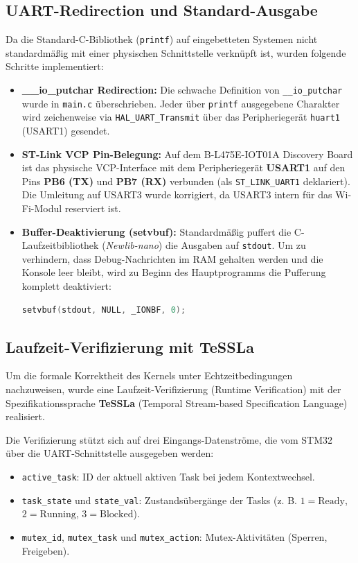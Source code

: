 \documentclass[11pt,a4paper]{article}
\begin{document}
\subsection{UART-Redirection und Standard-Ausgabe}
Da die Standard-C-Bibliothek (\texttt{printf}) auf eingebetteten Systemen nicht standardmäßig mit einer physischen Schnittstelle verknüpft ist, wurden folgende Schritte implementiert:
\begin{itemize}
    \item \textbf{\_\_io\_putchar Redirection:} Die schwache Definition von \texttt{\_\_io\_putchar} wurde in \texttt{main.c} überschrieben. Jeder über \texttt{printf} ausgegebene Charakter wird zeichenweise via \texttt{HAL\_UART\_Transmit} über das Peripheriegerät \texttt{huart1} (USART1) gesendet.
    \item \textbf{ST-Link VCP Pin-Belegung:} Auf dem B-L475E-IOT01A Discovery Board ist das physische VCP-Interface mit dem Peripheriegerät \textbf{USART1} auf den Pins \textbf{PB6 (TX)} und \textbf{PB7 (RX)} verbunden (als \texttt{ST\_LINK\_UART1} deklariert). Die Umleitung auf USART3 wurde korrigiert, da USART3 intern für das Wi-Fi-Modul reserviert ist.
    \item \textbf{Buffer-Deaktivierung (setvbuf):} Standardmäßig puffert die C-Laufzeitbibliothek (\textit{Newlib-nano}) die Ausgaben auf \texttt{stdout}. Um zu verhindern, dass Debug-Nachrichten im RAM gehalten werden und die Konsole leer bleibt, wird zu Beginn des Hauptprogramms die Pufferung komplett deaktiviert:
    \begin{lstlisting}[language=C]
setvbuf(stdout, NULL, _IONBF, 0);
    \end{lstlisting}
\end{itemize}

\subsection{Laufzeit-Verifizierung mit TeSSLa}
Um die formale Korrektheit des Kernels unter Echtzeitbedingungen nachzuweisen, wurde eine Laufzeit-Verifizierung (Runtime Verification) mit der Spezifikationssprache \textbf{TeSSLa} (Temporal Stream-based Specification Language) realisiert.

Die Verifizierung stützt sich auf drei Eingangs-Datenströme, die vom STM32 über die UART-Schnittstelle ausgegeben werden:
\begin{itemize}
    \item \texttt{active\_task}: ID der aktuell aktiven Task bei jedem Kontextwechsel.
    \item \texttt{task\_state} und \texttt{state\_val}: Zustandsübergänge der Tasks (z. B. $1 = \text{Ready}$, $2 = \text{Running}$, $3 = \text{Blocked}$).
    \item \texttt{mutex\_id}, \texttt{mutex\_task} und \texttt{mutex\_action}: Mutex-Aktivitäten (Sperren, Freigeben).
\end{itemize}
\end{document}
